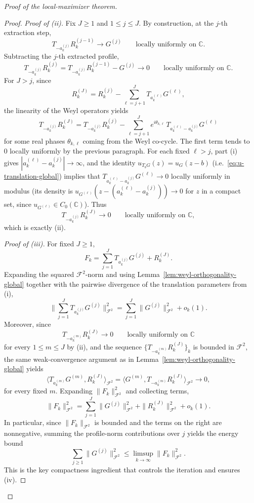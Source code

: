 \documentclass[a4paper,11pt,reqno]{amsart}
\numberwithin{equation}{section}
\theoremstyle{plain} %
\theoremstyle{definition} %
\theoremstyle{remark}
\newcommand{\C}{\mathbb{C}}
\begin{document}
\begin{proof}[Proof of the local-maximizer theorem]
\begin{proof}
\medskip
\noindent\emph{Proof of (ii).}
Fix \(J\ge 1\) and \(1\le j\le J\). By construction, at the \(j\)-th
extraction step,
\[
T_{-a_k^{(j)}}R_k^{(j-1)}\to G^{(j)}
\qquad\text{locally uniformly on }\C.
\]
Subtracting the \(j\)-th extracted profile,
\[
T_{-a_k^{(j)}}R_k^{(j)}
=
T_{-a_k^{(j)}}R_k^{(j-1)}-G^{(j)}
\to 0
\qquad\text{locally uniformly on }\C.
\]
For \(J>j\), since
\[
R_k^{(J)}
=
R_k^{(j)}-\sum_{\ell=j+1}^J T_{a_k^{(\ell)}}G^{(\ell)},
\]
the linearity of the Weyl operators yields
\[
T_{-a_k^{(j)}}R_k^{(J)}
=
T_{-a_k^{(j)}}R_k^{(j)}
-\sum_{\ell=j+1}^J e^{i\theta_{k,\ell}}\,T_{a_k^{(\ell)}-a_k^{(j)}}G^{(\ell)}
\]
for some real phases \(\theta_{k,\ell}\) coming from the Weyl co-cycle. The
first term tends to \(0\) locally uniformly by the previous paragraph. For
each fixed \(\ell>j\), part (i) gives \(|a_k^{(\ell)}-a_k^{(j)}|\to\infty\),
and the identity \(u_{T_b G}(z)=u_G(z-b)\) (i.e.\
\eqref{eq:u-translation-global}) implies that
\(T_{a_k^{(\ell)}-a_k^{(j)}}G^{(\ell)}\to 0\) locally uniformly in modulus
(its density is \(u_{G^{(\ell)}}(z-(a_k^{(\ell)}-a_k^{(j)}))\to 0\) for
\(z\) in a compact set, since \(u_{G^{(\ell)}}\in C_0(\C)\)). Thus
\[
T_{-a_k^{(j)}}R_k^{(J)}\to 0
\qquad\text{locally uniformly on }\C,
\]
which is exactly (ii).

\medskip
\noindent\emph{Proof of (iii).}
For fixed \(J\ge 1\),
\[
F_k=\sum_{j=1}^J T_{a_k^{(j)}}G^{(j)}+R_k^{(J)}.
\]
Expanding the squared \(\mathcal F^2\)-norm and using
Lemma~\ref{lem:weyl-orthogonality-global} together with the pairwise
divergence of the translation parameters from (i),
\[
\Big\|\sum_{j=1}^J T_{a_k^{(j)}}G^{(j)}\Big\|_{\mathcal F^2}^2
=
\sum_{j=1}^J \|G^{(j)}\|_{\mathcal F^2}^2+o_k(1).
\]
Moreover, since
\[
T_{-a_k^{(m)}}R_k^{(J)}\to 0
\qquad\text{locally uniformly on }\C
\]
for every \(1\le m\le J\) by (ii), and the sequence
\(\{T_{-a_k^{(m)}}R_k^{(J)}\}_k\) is bounded in \(\mathcal F^2\), the same
weak-convergence argument as in
Lemma~\ref{lem:weyl-orthogonality-global} yields
\[
\langle T_{a_k^{(m)}}G^{(m)},R_k^{(J)}\rangle_{\mathcal F^2}
=
\langle G^{(m)},T_{-a_k^{(m)}}R_k^{(J)}\rangle_{\mathcal F^2}\to 0,
\]
for every fixed \(m\). Expanding \(\|F_k\|_{\mathcal F^2}^2\) and collecting
terms,
\[
\|F_k\|_{\mathcal F^2}^2
=
\sum_{j=1}^J \|G^{(j)}\|_{\mathcal F^2}^2
+\|R_k^{(J)}\|_{\mathcal F^2}^2
+o_k(1).
\]
In particular, since \(\|F_k\|_{\mathcal F^2}\) is bounded and the terms on
the right are nonnegative, summing the profile-norm contributions over \(j\)
yields the energy bound
\begin{equation}\label{eq:energy-bound-profiles}
\sum_{j\ge 1}\|G^{(j)}\|_{\mathcal F^2}^2
\le \limsup_{k\to\infty}\|F_k\|_{\mathcal F^2}^2.
\end{equation}
This is the key compactness ingredient that controls the iteration and
ensures (iv).


\end{proof}
\end{proof}
\end{document}

